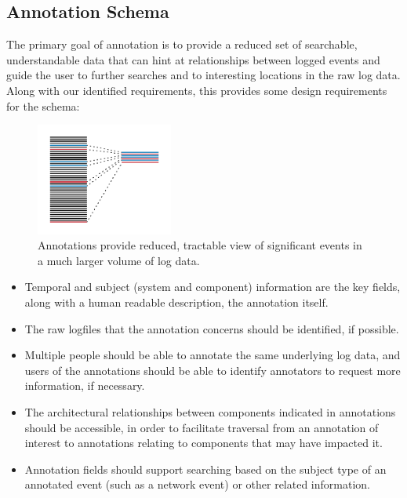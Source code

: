 \subsection{Annotation Schema}

The primary goal of annotation is to provide a reduced set of searchable,
understandable data that can hint at relationships between logged 
events and guide the user to further searches and to interesting locations
in the raw log data. Along with our identified requirements, this 
provides some design requirements for the schema:

\begin{figure}
\includegraphics[width=0.4\textwidth]{annotations.png}
\caption{Annotations provide reduced, tractable view of significant events
in a much larger volume of log data.}
\label{f:annotations}
\end{figure}

\begin{itemize}
\item Temporal and subject (system and component) information are 
      the key fields, along with a human readable description, the 
      annotation itself.
\item The raw logfiles that the annotation concerns should be identified,
      if possible.
\item Multiple people should be able to annotate the same underlying 
      log data, and users of the annotations should be able to 
      identify annotators to request more information, if necessary.  
\item The architectural relationships between components indicated in 
      annotations should be accessible, in order to facilitate 
      traversal from an annotation of interest to annotations relating to
      components that may have impacted it.
\item Annotation fields should support searching based on the subject type 
      of an annotated event (such as a network event) or other 
      related information.
\end{itemize}

